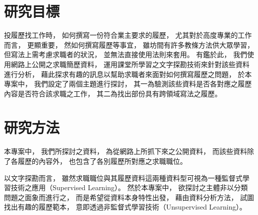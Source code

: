 \documentclass[acmsmall]{acmart}
\begin{document}

\maketitle

\section{研究目標}

投履歷找工作時，
如何撰寫一份符合業主要求的履歷，
尤其對於高度專業的工作而言，
更顯重要，
然如何撰寫履歷等事宜，
雖坊間有許多教條方法供大眾學習，
但寫法上需考慮求職者的狀況，
並無法直接使用法則來套用。
有鑑於此，
我們使用網路上公開之求職簡歷資料，
運用課堂所學習之文字探勘技術來針對該些資料進行分析，
藉此探求有趣的訊息以幫助求職者來面對如何撰寫履歷之問題，
於本專案中，
我們設定了兩個主題進行探討，
其一為驗測該些資料是否各對應之履歷內容是否符合該求職之工作，
其二為找出部份具有跨領域寫法之履歷。

\section{研究方法}

本專案中，
我們所探討之資料，
為從網路上所抓下來之公開資料，
而該些資料除了各履歷的內容外，
也包含了各別履歷所對應之求職職位。

以文字探勘而言，
雖然求職職位與其履歷資料這兩種資料型可視為一種監督式學習技術之應用（Supervised Learning）\cite{murphy2012machine}。
然於本專案中，
欲探討之主體非以分類問題之面象而進行之，
而是希望從資料本身特性出發，
藉由資料分析方法，
試圖找出有趣的履歷範本，
意即透過非監督式學習技術（Unsupervised Learning）\cite{murphy2012machine}。
\end{document}
